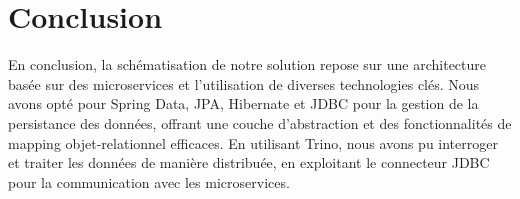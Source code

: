 \section*{Conclusion}

En conclusion, la schématisation de notre solution repose sur une architecture basée sur des microservices et l'utilisation de diverses technologies clés. Nous avons opté pour Spring Data, JPA, Hibernate et JDBC pour la gestion de la persistance des données, offrant une couche d'abstraction et des fonctionnalités de mapping objet-relationnel efficaces. En utilisant Trino, nous avons pu interroger et traiter les données de manière distribuée, en exploitant le connecteur JDBC pour la communication avec les microservices.